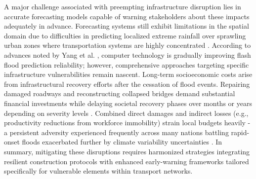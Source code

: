 A major challenge associated with preempting infrastructure disruption lies in accurate forecasting models capable of warning stakeholders about these impacts adequately in advance. Forecasting systems still exhibit limitations in the spatial domain due to difficulties in predicting localized extreme rainfall over sprawling urban zones where transportation systems are highly concentrated \citep{Ritter2021a}\citep{AlRawas2024}\citep{Lowrie2022}. According to advances noted by Yang et al. \citep{Yang2022}, computer technology is gradually improving flash flood prediction reliability; however, comprehensive approaches targeting specific infrastructure vulnerabilities remain nascent.
Long-term socioeconomic costs arise from infrastructural recovery efforts after the cessation of flood events. Repairing damaged roadways and reconstructing collapsed bridges demand substantial financial investments while delaying societal recovery phases over months or years depending on severity levels \citep{Abegaz2024}\citep{Saad2024}. Combined direct damages and indirect losses (e.g., productivity reductions from workforce immobility) strain local budgets heavily - a persistent adversity experienced frequently across many nations battling rapid-onset floods exacerbated further by climate variability uncertainties \citep{Ritter2021a}\citep{Saad2024}.
In summary, mitigating these disruptions requires harmonized strategies integrating resilient construction protocols with enhanced early-warning frameworks tailored specifically for vulnerable elements within transport networks.

